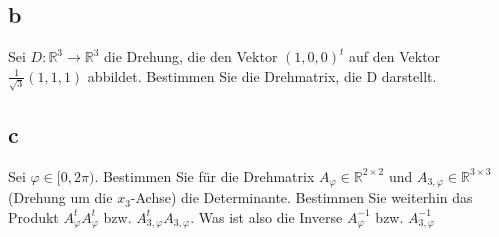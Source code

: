 \subsection{b}
Sei $D : \mathbb{R}^3 \rightarrow \mathbb{R}^3$ die Drehung, die den Vektor $(1, 0, 0)^t$ auf den Vektor 
$\frac{1}{\sqrt{3}}(1, 1, 1)$ abbildet. Bestimmen Sie die Drehmatrix, die D darstellt.

\subsection{c}

Sei $\varphi \in [0, 2\pi)$. Bestimmen Sie für die Drehmatrix $A_\varphi \in \mathbb{R}^{2 \times 2}$ und 
$A_{3, \varphi} \in \mathbb{R}^{3 \times 3}$ (Drehung um die $x_3$-Achse) die Determinante. Bestimmen Sie 
weiterhin das Produkt $A^t_\varphi A^t_\varphi$ bzw. $A^t_{3, \varphi} A_{3, \varphi}$. Was ist also die Inverse
$A^{-1}_{\varphi}$ bzw. $A^{-1}_{3, \varphi}$
